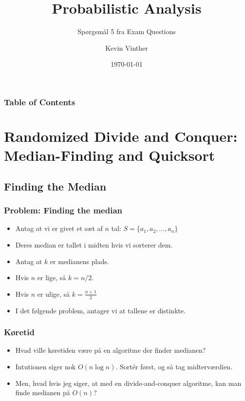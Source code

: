 \documentclass{beamer}
\title{Probabilistic Analysis}
\subtitle{Spørgsmål 5 fra Exam Questions}
\author{Kevin Vinther}
\date{\today}
\begin{document}
\begin{frame}
  \titlepage
\end{frame}

\begin{frame}[allowframebreaks]
  \frametitle{Table of Contents}
  \tableofcontents
\end{frame}

\section{Randomized Divide and Conquer: Median-Finding and Quicksort}
\label{sec:randdivvvvvannnnnddqounc}


\subsection{Finding the Median}
\label{subsec:findingmeadianmnnn!!}

\begin{frame}
  \frametitle{Problem: Finding the median}
  
  \begin{itemize}
  \item Antag at vi er givet et sæt af $n$ tal: $S = \{a_{1}, a_{2}, \ldots, a_{n}\}$
  \item Deres median er tallet i midten hvis vi sorterer dem.
  \item Antag at $k$ er medianens plads.
  \item Hvis $n$ er lige, så $k = n/2$.
  \item Hvis $n$ er ulige, så $k = \frac{n+1}{2}$
  \item I det følgende problem, antager vi at tallene er distinkte.
  \end{itemize}
\end{frame}

\begin{frame}
  \frametitle{Køretid}

  \begin{itemize}
  \item<1-> Hvad ville køretiden være på en algoritme der finder medianen?
  \item<2-> Intutionen siger nok $O(n \log n)$. Sortér først, og så tag midterværdien.
  \item<2-> Men, hvad hvis jeg siger, at med en divide-and-conquer algoritme, kan man finde medianen på $O(n)$?
  \end{itemize}
\end{frame}
\end{document}

